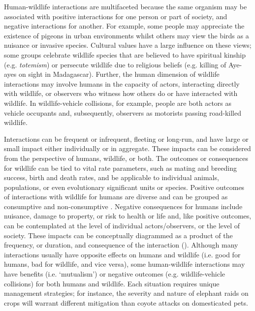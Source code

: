 Human-wildlife interactions are multifaceted because the same organism may be associated with positive interactions for one person or part of society, and negative interactions for another. For example, some people may appreciate the existence of pigeons in urban environments whilst others may view the birds as a nuisance or invasive species. Cultural values have a large influence on these views; some groups celebrate wildlife species that are believed to have spiritual kinship (e.g. \textit{totemism}) or persecute wildlife due to religious beliefs (e.g. killing of Aye-ayes on sight in Madagascar). Further, the human dimension of wildlife interactions may involve humans in the capacity of actors, interacting directly with wildlife, or observers who witness how others do or have interacted with wildlife. In wildlife-vehicle collisions, for example, people are both actors as vehicle occupants and, subsequently, observers as motorists passing road-killed wildlife.

Interactions can be frequent or infrequent, fleeting or long-run, and have large or small impact either individually or in aggregate. These impacts can be considered from the perspective of humans, wildlife, or both. The outcomes or consequences for wildlife can be tied to vital rate parameters, such as mating and breeding success, birth and death rates, and be applicable to individual animals, populations, or even evolutionary significant units or species. Positive outcomes of interactions with wildlife for humans are diverse and can be grouped as consumptive and non-consumptive \citep{char02}. Negative consequences for humans include nuisance, damage to property, or risk to health or life and, like positive outcomes, can be contemplated at the level of individual actors/observers, or the level of society. These impacts can be conceptually diagrammed as a product of the frequency, or duration, and consequence of the interaction (). Although many interactions usually have opposite effects on humans and wildlife (i.e. good for humans, bad for wildlife, and vice versa), some human-wildlife interactions may have benefits (i.e. `mutualism') or negative outcomes (e.g. wildlife-vehicle collisions) for both humans and wildlife. Each situation requires unique management strategies; for instance, the severity and nature of elephant raids on crops will warrant different mitigation than coyote attacks on domesticated pets. 

